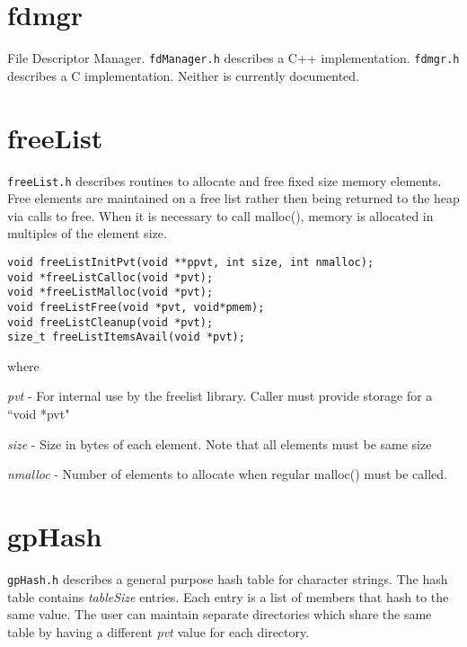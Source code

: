 \section{  fdmgr}

File Descriptor Manager. \verb|fdManager.h| describes a C++ implementation. \verb|fdmgr.h| describes a C implementation. 
Neither is currently documented.

\section{freeList}

\verb|freeList.h| describes routines to allocate and free fixed size memory elements.   Free elements are maintained on a 
free list rather then being returned to the heap via calls to free. When it is necessary to call malloc(), memory is allocated 
in multiples of the element size.

\begin{verbatim}
void freeListInitPvt(void **ppvt, int size, int nmalloc);
void *freeListCalloc(void *pvt);
void *freeListMalloc(void *pvt);
void freeListFree(void *pvt, void*pmem);
void freeListCleanup(void *pvt);
size_t freeListItemsAvail(void *pvt);
\end{verbatim}

where

\begin{description}
\item \emph{pvt}  - For internal use by the freelist library. Caller must provide storage for a ``void *pvt"

\item \emph{size} - Size in bytes of each element. Note that all elements must be same size

\item \emph{nmalloc} - Number of elements to allocate when regular malloc() must be called.

\end{description}

\section{gpHash}

\verb|gpHash.h| describes a general purpose hash table for character strings. The hash table contains \emph{tableSize} entries. Each 
entry is a list of members that hash to the same value. The user can maintain separate directories which share the same 
table by having a different \emph{pvt} value for each directory.

